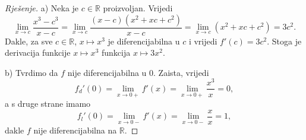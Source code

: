 \begin{proof}[Rješenje]
a) Neka je $c\in \mathbb{R}$ proizvoljan. Vrijedi
$$\lim\limits_{x\to c}{\dfrac{x^3-c^3}{x-c}}=\lim\limits_{x\to c}{\dfrac{(x-c)(x^2+xc+c^2)}{x-c}}=\lim\limits_{x\to c}{\left(x^2+xc+c^2\right)}=3c^2.$$
Dakle, za sve $c\in \mathbb{R}$, $x\mapsto x^3$ je diferencijabilna u $c$ i vrijedi $f'(c)=3c^2$. Stoga je derivacija funkcije $x\mapsto x^3$ funkcija $x\mapsto 3x^2$.

b) Tvrdimo da $f$ nije diferencijabilna u $0$. Zaista, vrijedi $$f_d'(0)=\lim\limits_{x\to 0+}{f'(x)}=\lim\limits_{x\to 0+}{\dfrac{x^3}{x}}=0,$$
a s druge strane imamo 
$$f_l'(0)=\lim\limits_{x\to 0-}{f'(x)}=\lim\limits_{x\to 0-}{\dfrac{x}{x}}=1,$$
dakle $f$ nije diferencijabilna na $\mathbb{R}$.
\end{proof}

